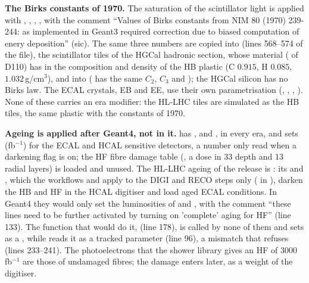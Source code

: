 \textbf{The Birks constants of 1970.} The saturation of the scintillator light is applied with
, , , , with the
comment ``Values of Birks constants from NIM 80 (1970) 239-244: as implemented in Geant3 required correction due
to biased computation of enery deposition'' (sic). The same three numbers are copied into 
(lines 568--574 of the file), the scintillator tiles of the HGCal hadronic section, whose material
 ( of D110) has in  the
composition and density of the HB plastic  (C $0.915$, H $0.085$, $1.032$\,g/cm$^3$),
and into  ( has the same $C_2$, $C_3$ and ); the HGCal
silicon has no Birks law. The ECAL crystals, EB and EE, use their own parametrisation
(, , , ). None of these carries an era modifier: the HL-LHC tiles are simulated as the HB tiles, the same plastic
with the constants of 1970.

\textbf{Ageing is applied after Geant4, not in it.}  has ,  and
,  in every era, and  sets 
(fb$^{-1}$) for the ECAL and HCAL sensitive detectors, a number only read when a darkening flag is on; the HF fibre
damage table (, a dose in 33 depth and 13 radial layers) is
loaded and unused. The HL-LHC ageing of the release is :
its  and , which the  workflows  and
 apply to the DIGI and RECO steps only ( in
), darken the HB and HF in the HCAL digitiser and load aged ECAL conditions.
In Geant4 they would only set the luminosities of  and , with the comment ``these lines
need to be further activated by turning on 'complete' aging for HF'' (line 133). The function that would do it,
 (line 178), is called by none of them and sets  as a
, while  reads it as a tracked parameter (line 96), a
mismatch that  refuses (lines 233--241). The photoelectrons that the
shower library gives an HF of $3000$\,fb$^{-1}$ are those of undamaged fibres; the damage enters later, as a weight
of the digitiser.

